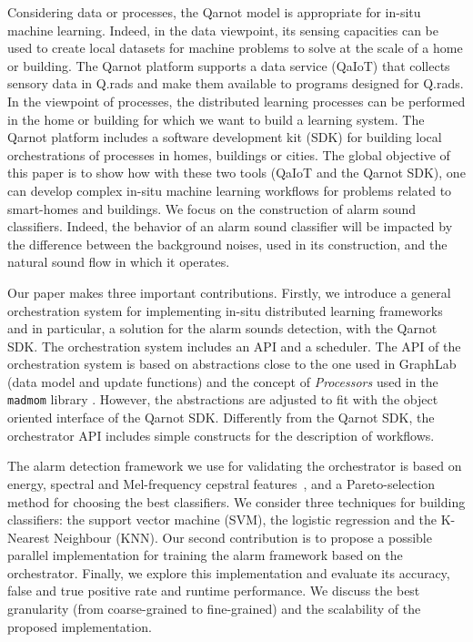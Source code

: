 \documentclass[10pt, conference, compsocconf]{IEEEtran}
\begin{document}
Considering data or processes, the Qarnot model is appropriate for in-situ machine learning. Indeed, in the data viewpoint, 
its sensing capacities can be used to create local datasets for machine problems to solve at the scale of a home or building. 
The Qarnot platform supports a data service (QaIoT) that collects sensory data in Q.rads 
and make them available to programs designed for Q.rads. 
In the viewpoint of processes, the distributed learning processes can be performed in the home or building for which we want to 
build a learning system. The Qarnot platform includes a software development kit (SDK) for building local orchestrations 
of processes in homes, buildings or cities.
The global objective of this paper is to show how with these two tools (QaIoT and the Qarnot SDK), 
one can develop complex in-situ machine learning workflows for problems related to smart-homes and buildings. 
We focus on the construction of alarm sound classifiers.  Indeed, the behavior of an alarm sound classifier will be impacted by the 
difference between the background noises, used in its construction, and the natural sound flow in which it operates. 

Our paper makes three important contributions. Firstly, we introduce a general orchestration system for implementing in-situ 
distributed learning frameworks and in particular, a solution for the alarm sounds detection, with the Qarnot SDK. 
The orchestration system includes an API and a scheduler. 
The API of the orchestration system is based on abstractions close to the one used in 
GraphLab~\cite{Low:2012:DGF:2212351.2212354} (data model and update functions) and the concept of {\it Processors} used 
in the \texttt{madmom} library \cite{DBLP:journals/corr/BockKSKW16}. However, the abstractions are adjusted to fit with the 
object oriented interface of the Qarnot SDK. Differently from the Qarnot SDK, the orchestrator API includes simple 
constructs for the description of workflows. 

The alarm detection framework we use for validating the orchestrator is based on energy, spectral and Mel-frequency cepstral features~\cite{ganchev2005comparative}, \cite{pyAudioAnalysis}
and a Pareto-selection method for choosing the best classifiers. We consider three techniques for building classifiers: the support vector machine (SVM), the logistic regression and the K-Nearest Neighbour (KNN). Our second contribution is to propose a possible parallel 
implementation for training the alarm framework based on the orchestrator. Finally, we explore this implementation and evaluate its accuracy, 
false and true positive rate and runtime performance. We discuss the best granularity (from coarse-grained to fine-grained) and the scalability of the proposed implementation.
\end{document}
